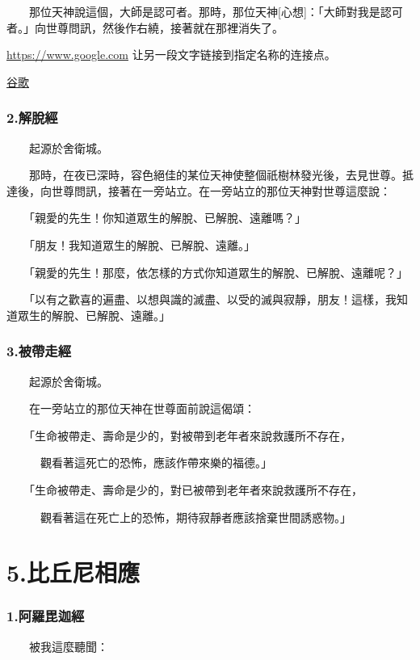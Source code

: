 \documentclass[12pt,oneside]{book}
\begin{document}
　　那位天神說這個，大師是認可者。那時，那位天神[心想]：「大師對我是認可者。」向世尊問訊，然後作右繞，接著就在那裡消失了。

\hyperlink{sn 1.1}{https://www.google.com} 让另一段文字链接到指定名称的连接点。

\href{https://www.google.com}{\underline{谷歌}}

\subsection{2.解脫經}
　　起源於舍衛城。

　　那時，在夜已深時，容色絕佳的某位天神使整個祇樹林發光後，去見世尊。抵達後，向世尊問訊，接著在一旁站立。在一旁站立的那位天神對世尊這麼說：

　　「親愛的先生！你知道眾生的解脫、已解脫、遠離嗎？」

　　「朋友！我知道眾生的解脫、已解脫、遠離。」

　　「親愛的先生！那麼，依怎樣的方式你知道眾生的解脫、已解脫、遠離呢？」

　　「以有之歡喜的遍盡、以想與識的滅盡、以受的滅與寂靜，朋友！這樣，我知道眾生的解脫、已解脫、遠離。」

\subsection{3.被帶走經}

　　起源於舍衛城。

　　在一旁站立的那位天神在世尊面前說這偈頌：

　　「生命被帶走、壽命是少的，對被帶到老年者來說救護所不存在，

　　　觀看著這死亡的恐怖，應該作帶來樂的福德。」

　　「生命被帶走、壽命是少的，對已被帶到老年者來說救護所不存在，

　　　觀看著這在死亡上的恐怖，期待寂靜者應該捨棄世間誘惑物。」

\chapter{5.比丘尼相應}

\subsection{1.阿羅毘迦經}
\label{subsec:5.1ss}

　　被我這麼聽聞：
\end{document}
